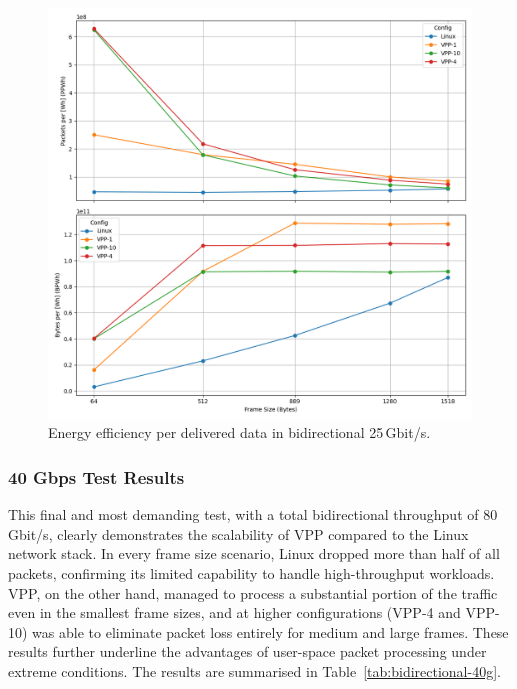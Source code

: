 \begin{figure}[!htbp]
    \centering
    \includegraphics[width=\linewidth]{images/consumption-bi-25g.png}
    \caption{Energy efficiency per delivered data in bidirectional 25\,Gbit/s.}
    \label{fig:bi-25g}
\end{figure}



\subsubsection{40 Gbps Test Results}

This final and most demanding test, with a total bidirectional throughput of 80\,Gbit/s, clearly demonstrates the scalability of VPP compared to the Linux network stack.  
In every frame size scenario, Linux dropped more than half of all packets, confirming its limited capability to handle high-throughput workloads.  
VPP, on the other hand, managed to process a substantial portion of the traffic even in the smallest frame sizes, 
and at higher configurations (VPP-4 and VPP-10) was able to eliminate packet loss entirely for medium and large frames.  
These results further underline the advantages of user-space packet processing under extreme conditions.
The results are summarised in Table~\ref{tab:bidirectional-40g}.

